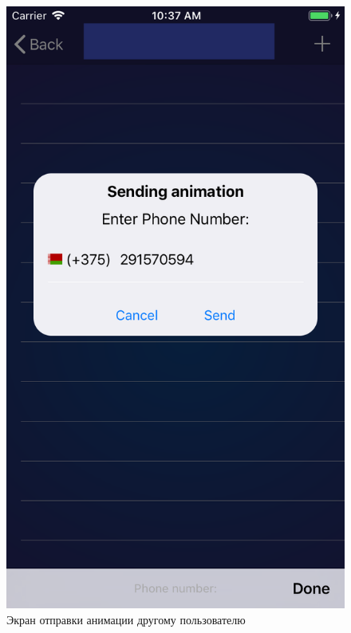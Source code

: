 \begin{figure}[H]
\centering
	\includegraphics[scale=0.2]{figures/userGuide/sendingAnimation.png}
	\caption{Экран отправки анимации другому пользователю}
	\label{fig:develop:userGuide:sendingAnimation}
\end{figure}
~
